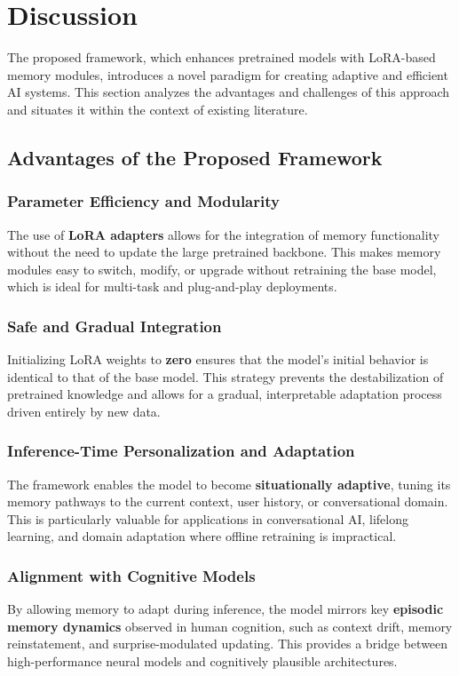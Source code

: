 \section{Discussion}
The proposed framework, which enhances pretrained models with LoRA-based
memory modules, introduces a novel paradigm for creating adaptive and
efficient AI systems. This section analyzes the advantages and challenges
of this approach and situates it within the context of existing literature.

\subsection{Advantages of the Proposed Framework}

\subsubsection{Parameter Efficiency and Modularity}
The use of \textbf{LoRA adapters} allows for the integration of memory
functionality without the need to update the large pretrained backbone.
This makes memory modules easy to switch, modify, or upgrade without
retraining the base model, which is ideal for multi-task and plug-and-play
deployments.

\subsubsection{Safe and Gradual Integration}
Initializing LoRA weights to \textbf{zero} ensures that the model's initial
behavior is identical to that of the base model. This strategy prevents the
destabilization of pretrained knowledge and allows for a gradual,
interpretable adaptation process driven entirely by new data.

\subsubsection{Inference-Time Personalization and Adaptation}
The framework enables the model to become \textbf{situationally adaptive},
tuning its memory pathways to the current context, user history, or
conversational domain. This is particularly valuable for applications in
conversational AI, lifelong learning, and domain adaptation where
offline retraining is impractical.

\subsubsection{Alignment with Cognitive Models}
By allowing memory to adapt during inference, the model mirrors key
\textbf{episodic memory dynamics} observed in human cognition, such as
context drift, memory reinstatement, and surprise-modulated updating.
This provides a bridge between high-performance neural models and
cognitively plausible architectures.

